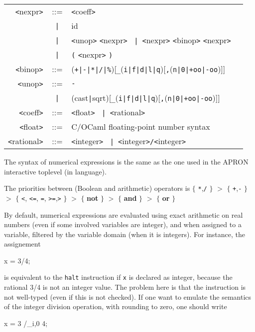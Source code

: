 \documentclass[a4paper,11pt]{article}
\newcommand{\pkw}[1]{\textcolor{progkeyword}{#1}}
\newcommand{\sx}[1]{\textcolor{prog}{\texttt{<}#1\texttt{>}}}
\newcommand{\kw}[1]{\textcolor{progkeyword}{\textbf{#1}}}
\newcommand{\tk}[1]{\textcolor{token}{\texttt{#1}}}
\newcommand{\sor}{\texttt{~|~}}
\newenvironment{syntax}
{
\T\medskip
\begin{tabular}{rcll}
}
{
\end{tabular}
\T\par\medskip
}
\newenvironment{prog}
{\begin{example}\color{prog}}
{\end{example}\par}
\newcommand{\ocaml}{\xlink{OCaml}{http://www.caml.org}\xspace}
\begin{document}
\begin{syntax}
  \sx{nexpr} &::=& \sx{coeff} \\
  &\sor& id \\
  &\sor& \sx{unop} \sx{nexpr} \sor \sx{nexpr} \sx{binop} \sx{nexpr} \\
  &\sor& \tk{(} \sx{nexpr} \tk{)} \\
  \sx{binop} &::=& (\tk{+}\texttt{|}\tk{-}\texttt{|}\tk{*}\texttt{|}\tk{/}\texttt{|}\tk{\%})[\tk{\_}(\tk{i}\texttt{|}\tk{f}\texttt{|}\tk{d}\texttt{|}\tk{l}\texttt{|}\tk{q})[\tk{,}(\tk{n}\texttt{|}\tk{0}\texttt{|}\tk{+oo}\texttt{|}\tk{-oo})]] \\
  \sx{unop} &::=& \tk{-} \\
  &\sor& (\pkw{cast}\texttt{|}\pkw{sqrt})[\tk{\_}(\tk{i}\texttt{|}\tk{f}\texttt{|}\tk{d}\texttt{|}\tk{l}\texttt{|}\tk{q})[\tk{,}(\tk{n}\texttt{|}\tk{0}\texttt{|}\tk{+oo}\texttt{|}\tk{-oo})]] \\
  \sx{coeff} &::=& \sx{float} \sor \sx{rational} \\
  \sx{float} &::=& C/OCaml floating-point number syntax \\
  \sx{rational} &::=& \sx{integer} \sor \sx{integer}\tk{/}\sx{integer}
\end{syntax}
The syntax of numerical expressions is the same as the one used in
the APRON interactive toplevel (in \ocaml language).

The priorities between (Boolean and arithmetic) operators is
$\{$ \tk{*},\tk{/} $\}$
\textcolor{prog}{$>$} $\{$ \tk{+},\tk{-} $\}$
\textcolor{prog}{$>$} $\{$ \tk{<}, \tk{<=}, \tk{=}, \tk{>=},\tk{>} $\}$
\textcolor{prog}{$>$} $\{$ \kw{not} $\}$
\textcolor{prog}{$>$} $\{$ \kw{and} $\}$
\textcolor{prog}{$>$} $\{$ \kw{or} $\}$

By default, numerical expressions are evaluated using exact
arithmetic on real numbers (even if some involved variables are
integer), and when assigned to a variable, filtered by the
variable domain (when it is integers). For instance, the
assignement
\begin{prog}
  x = 3/4;
\end{prog}
\noindent is equivalent to the \texttt{halt} instruction if
\texttt{x} is declared as integer, because the rational 3/4 is not
an integer value. The problem here is that the instruction is not
well-typed (even if this is not checked). If one want to emulate
the semantics of the integer division operation, with rounding to
zero, one should write
\begin{prog}
  x = 3 /_i,0 4;
\end{prog}
\end{document}
